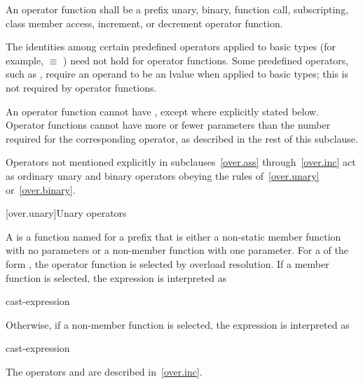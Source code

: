 \pnum
An operator function shall be a
prefix unary, binary, function call, subscripting, class member access, increment, or decrement
operator function.

\pnum
{}%
\begin{note}
The identities among certain predefined operators applied to basic types
(for example,
 $\equiv$
)
need not hold for operator functions.
Some predefined operators, such as
\tcode{+=},
require an operand to be an lvalue when applied to basic types;
this is not required by operator functions.
\end{note}

\pnum
{}%
An operator function cannot have ,
except where explicitly stated below.
Operator
functions cannot have more or fewer parameters than the
number required for the corresponding operator, as
described in the rest of this subclause.

\pnum
Operators not mentioned explicitly in subclauses~\ref{over.ass} through~\ref{over.inc}
act as ordinary unary and binary
operators obeying the rules of~\ref{over.unary} or~\ref{over.binary}.%
%

[over.unary]{Unary operators}%
%

\pnum
A 
is a function named 
for a prefix  
that is either
a non-static member function with no parameters or
a non-member function with one parameter.
%
For a 
of the form ,
the operator function is selected by overload resolution.
If a member function is selected,
the expression is interpreted as
\begin{ncsimplebnf}
cast-expression    \terminal{(}\terminal{)}
\end{ncsimplebnf}
Otherwise, if a non-member function is selected,
the expression is interpreted as
\begin{ncsimplebnf}
  \terminal{(} cast-expression \terminal{)}
\end{ncsimplebnf}
\begin{note}
The operators \tcode{++} and \tcode{\dcr}
are described in~\ref{over.inc}.
\end{note}

